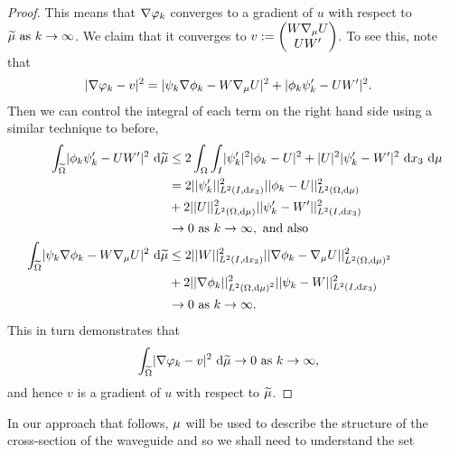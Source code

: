 \begin{proof}
	This means that $\nabla\varphi_k$ converges to a gradient of $u$ with respect to $\widetilde{\mu} \ \text{as} \ k \rightarrow\infty$.
	We claim that it converges to $v := \begin{pmatrix} W \nabla_\mu U \\	U W' \end{pmatrix}$.
	To see this, note that
	\begin{align*}
		\lvert \nabla\varphi_k - v \rvert^2 &= \lvert \psi_k\nabla\phi_k - W\nabla_\mu U \rvert^2 + \lvert \phi_k\psi'_k-UW' \rvert^2.
	\end{align*}
	Then we can control the integral of each term on the right hand side using a similar technique to before,
	\begin{align*}
		\begin{split}
			\int_{\widetilde{\Omega}}\lvert \phi_k\psi'_k-UW' \rvert^2 \ \mathrm{d}\widetilde{\mu} &\leq 2\int_{\Omega}\int_{I}\lvert \psi'_k \rvert^2\lvert \phi_k - U \rvert^2 + \lvert U \rvert^2\lvert \psi'_k - W' \rvert^2 \ \mathrm{d}x_3 \ \mathrm{d}\mu \\
			&= 2\lvert\lvert \psi'_k \rvert\rvert_{L^{2}\left( I,\mathrm{d}x_3 \right)}^2\lvert\lvert \phi_k - U \rvert\rvert_{L^{2}\left( \Omega,\mathrm{d}\mu \right)}^2 \\
			&+ 2\lvert\lvert U \rvert\rvert_{L^{2}\left( \Omega,\mathrm{d}\mu \right)}^2\lvert\lvert \psi'_k - W' \rvert\rvert_{L^{2}\left( I,\mathrm{d}x_3 \right)}^2 \\
			&\rightarrow 0 \ \text{as} \ k \rightarrow\infty, \text{ and also} \\
			\int_{\widetilde{\Omega}}\lvert \psi_k\nabla\phi_k - W\nabla_\mu U \rvert^2 \ \mathrm{d}\widetilde{\mu} &\leq 2\lvert\lvert W \rvert\rvert_{L^{2}\left( I,\mathrm{d}x_3 \right)}^2\lvert\lvert \nabla\phi_k - \nabla_\mu U \rvert\rvert_{L^{2}\left( \Omega,\mathrm{d}\mu \right)^2}^2 \\
			&+ 2\lvert\lvert \nabla\phi_k \rvert\rvert_{L^{2}\left( \Omega,\mathrm{d}\mu \right)^2}^2\lvert\lvert \psi_k - W \rvert\rvert_{L^{2}\left( I,\mathrm{d}x_3 \right)}^2 \\
			&\rightarrow 0 \ \text{as} \ k \rightarrow\infty.
		\end{split}
	\end{align*}
	This in turn demonstrates that
	\begin{align*}
		\int_{\widetilde{\Omega}}\lvert \nabla\varphi_k - v \rvert^2 \ \mathrm{d}\widetilde{\mu} &\rightarrow 0 \ \text{as} \ k \rightarrow\infty,
	\end{align*}
	and hence $v$ is a gradient of $u$ with respect to $\widetilde{\mu}$.
\end{proof}


In our approach that follows, $\mu$ will be used to describe the structure of the cross-section of the waveguide and so we shall need to understand the set 